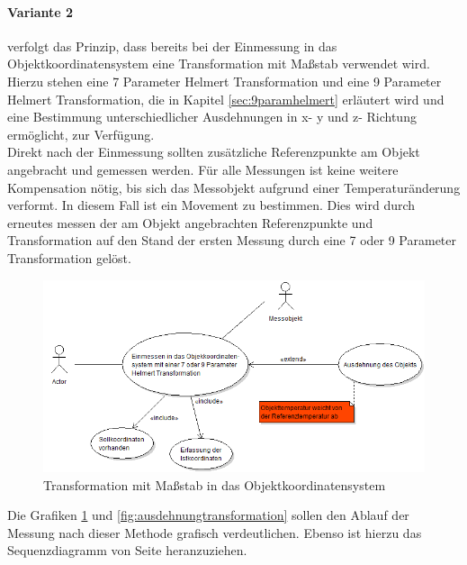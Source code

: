 \paragraph{Variante 2} verfolgt das Prinzip, dass bereits bei der Einmessung in das Objektkoordinatensystem eine Transformation mit Maßstab verwendet wird. Hierzu stehen eine 7 Parameter Helmert Transformation und eine 9 Parameter Helmert Transformation, die in Kapitel \ref{sec:9paramhelmert} erläutert wird und eine Bestimmung unterschiedlicher Ausdehnungen in x- y und z- Richtung ermöglicht, zur Verfügung.\\
Direkt nach der Einmessung sollten zusätzliche Referenzpunkte am Objekt angebracht und gemessen werden. Für alle Messungen ist keine weitere Kompensation nötig, bis sich das Messobjekt aufgrund einer Temperaturänderung verformt. In diesem Fall ist ein Movement zu bestimmen. Dies wird durch erneutes messen der am Objekt angebrachten Referenzpunkte und Transformation auf den Stand der ersten Messung durch eine 7 oder 9 Parameter Transformation gelöst.  
\begin{figure}[h]
	\label{fig:einmessenmassstab}
	\centering
		\includegraphics[scale=0.5]{UMLDiagramme/einmessenMitMassstabUML}
	\caption{Transformation mit Maßstab in das Objektkoordinatensystem}
\end{figure}

Die Grafiken \ref{fig:einmessenmassstab} und \ref{fig:ausdehnungtransformation} sollen den Ablauf der Messung nach dieser Methode grafisch verdeutlichen. Ebenso ist hierzu das Sequenzdiagramm von Seite \pageref{fig:massstabSequenz} heranzuziehen.

